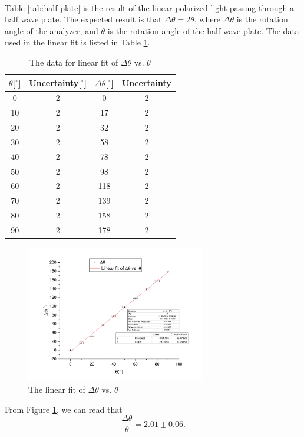 \documentclass{my_template}
\begin{document}
    \paragraph{} Table \ref{tab:half plate} is the result of the linear polarized light passing through a half wave plate. The expected result is that $\Delta\theta=2\theta$, where $\Delta\theta$ is the rotation angle of the analyzer, and $\theta$ is the rotation angle of the half-wave plate. The data used in the linear fit is listed in Table \ref{tab:half linear fit}.
    \begin{table}
        \centering
        \begin{tabular}{|c|c|c|c|}
            \hline
            $\theta$[$^\circ$]&Uncertainty[$^\circ$]&$\Delta\theta$[$^\circ$]&Uncertainty\\\hline
            0&2&0&2\\\hline
            10&2&17&2\\\hline
            20&2&32&2\\\hline
            30&2&58&2\\\hline
            40&2&78&2\\\hline
            50&2&98&2\\\hline
            60&2&118&2\\\hline
            70&2&139&2\\\hline
            80&2&158&2\\\hline
            90&2&178&2\\\hline
        \end{tabular}
        \caption{The data for linear fit of $\Delta\theta$ vs. $\theta$}
        \label{tab:half linear fit}
    \end{table}
    \begin{figure}[!ht]
        \centering
        \includegraphics[width=0.7\textwidth]{fig/half.pdf}
        \caption{The linear fit of $\Delta\theta$ vs. $\theta$}
        \label{fig: half linear fit}
    \end{figure}
    From Figure \ref{fig: half linear fit}, we can read that $$\frac{\Delta\theta}{\theta}=2.01\pm 0.06.$$
\end{document}
